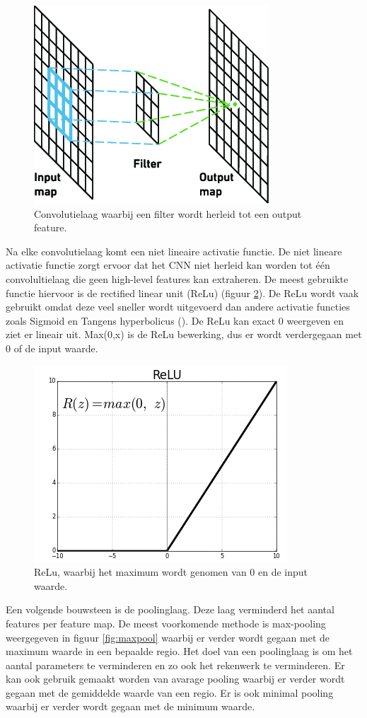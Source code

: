 \begin{figure}[!ht]
	\centering
	\includegraphics[width=0.35\linewidth]{fig/convolution layer.png}
	\caption{Convolutielaag waarbij een filter wordt herleid tot een output feature.}
	\label{fig:conv_laag}
\end{figure}

Na elke convolutielaag komt een niet lineaire activatie functie.
De niet lineare activatie functie zorgt ervoor dat het CNN niet herleid kan worden tot \'e\'en convolultielaag die geen high-level features kan extraheren. 
De meest gebruikte functie hiervoor is de rectified linear unit (ReLu) (figuur \ref{fig:relu}). 
De ReLu wordt vaak gebruikt omdat deze veel sneller wordt uitgevoerd dan andere activatie functies zoals Sigmoid en Tangens hyperbolicus (\cite{Krizhevsky_act_2017}).
De ReLu kan exact 0 weergeven en ziet er lineair uit. 
Max(0,x) is de ReLu bewerking, dus er wordt verdergegaan met 0 of de input waarde. 

\begin{figure}[!ht]
 	\centering
 	\includegraphics[width=0.35\linewidth]{fig/ReLu.png}
 	\caption{ReLu, waarbij het maximum wordt genomen van 0 en de input waarde.}
 	\label{fig:relu}
\end{figure}

Een volgende bouwsteen is de poolinglaag.
Deze laag verminderd het aantal features per feature map. 
De meest voorkomende methode is max-pooling weergegeven in figuur \ref{fig:maxpool} waarbij er verder wordt gegaan met de maximum waarde in een bepaalde regio. 
Het doel van een poolinglaag is om het aantal parameters te verminderen en zo ook het rekenwerk te verminderen. 
Er kan ook gebruik gemaakt worden van avarage pooling waarbij er verder wordt gegaan met de gemiddelde waarde van een regio. 
Er is ook minimal pooling waarbij er verder wordt gegaan met de minimum waarde.

